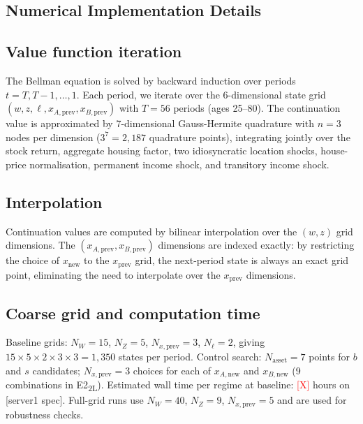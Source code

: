 \documentclass[12pt]{article}
\theoremstyle{definition}
\theoremstyle{remark}
\newcommand{\ph}[1]{\textcolor{red}{\textsc{[#1]}}}
\begin{document}
\clearpage
\begin{appendices}

\section{Numerical Implementation Details}
\label{app:numerical}

\subsection{Value function iteration}

The Bellman equation is solved by backward induction over periods $t = T, T-1,
\ldots, 1$.
Each period, we iterate over the 6-dimensional state grid $(w, z, \ell,
x_{A,\text{prev}}, x_{B,\text{prev}})$ with $T = 56$ periods (ages 25--80).
The continuation value is approximated by 7-dimensional Gauss-Hermite
quadrature with $n = 3$ nodes per dimension ($3^7 = 2{,}187$ quadrature points),
integrating jointly over the stock return, aggregate housing factor, two
idiosyncratic location shocks, house-price normalisation, permanent income shock,
and transitory income shock.

\subsection{Interpolation}

Continuation values are computed by bilinear interpolation over the $(w, z)$
grid dimensions.
The $(x_{A,\text{prev}}, x_{B,\text{prev}})$ dimensions are indexed exactly:
by restricting the choice of $x_{\text{new}}$ to the $x_{\text{prev}}$ grid,
the next-period state is always an exact grid point, eliminating the need to
interpolate over the $x_{\text{prev}}$ dimensions.

\subsection{Coarse grid and computation time}

Baseline grids: $N_W = 15$, $N_Z = 5$, $N_{x,\text{prev}} = 3$,
$N_{\ell} = 2$, giving $15 \times 5 \times 2 \times 3 \times 3 = 1{,}350$
states per period.
Control search: $N_{\text{asset}} = 7$ points for $b$ and $s$ candidates;
$N_{x,\text{prev}} = 3$ choices for each of $x_{A,\text{new}}$ and
$x_{B,\text{new}}$ (9 combinations in E2\textsubscript{2L}).
Estimated wall time per regime at baseline: \ph{X} hours on [server1 spec].
Full-grid runs use $N_W = 40$, $N_Z = 9$, $N_{x,\text{prev}} = 5$ and are
used for robustness checks.


\end{appendices}
\end{document}
